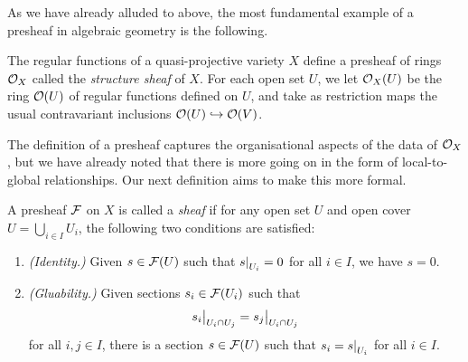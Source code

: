 As we have already alluded to above, the most fundamental example of
a presheaf in algebraic geometry is the following.

\begin{example}
  The regular functions of a quasi-projective variety $X$ define a
  presheaf of rings $\mathcal{O}_{{X}}$ called the \emph{structure sheaf} of $X$.
  For each open set $U$, we let $\mathcal{O}_{{X}}(U)$ be the ring
  $\mathcal{O}(U)$ of regular functions
  defined on $U$, and take as restriction maps the usual
  contravariant inclusions $\mathcal{O}(U) \hookrightarrow \mathcal{O}(V)$.
\end{example}

The definition of a presheaf captures the organisational aspects of
the data of $\mathcal{O}_{{X}}$, but we have already noted that there is
more going on in the form of local-to-global relationships.
Our next definition aims to make this more formal.

\begin{definition}
  \label{def_sheaf}
  A presheaf $\mathcal{F}$ on $X$ is called a \emph{sheaf} if for any
  open set $U$ and open cover $U = \bigcup_{i \in I} U_i$, the
  following two conditions are satisfied:
  \begin{enumerate}
    \item
      \emph{(Identity.)}
      Given $s \in \mathcal{F}(U)$ such that $\setres{s}{U_i} = 0$ for
      all $i \in I$, we have $s = 0$.

    \item
      \emph{(Gluability.)}
      Given sections $s_i \in \mathcal{F}(U_i)$ such that
      \[
        \setres{s_i}{U_i \cap U_j} = \setres{s_j}{U_i \cap U_j}
      \]
      for all $i, j \in I$, there is a section $s \in \mathcal{F}(U)$
      such that $s_i = \setres{s}{U_i}$ for all $i \in I$.
  \end{enumerate}
\end{definition}



